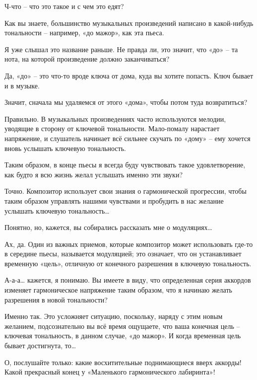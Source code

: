 \documentclass[../main.tex]{subfiles}
\begin{document}
\begin{Dialogue}
\begin{sublevel}
\begin{sublevel}
\begin{sublevel}
 Ч-что \--- что это такое и с чем это едят?

 Как вы знаете, большинство музыкальных произведений написано в какой-нибудь тональности \--- например, «до мажор», как эта пьеса.

 Я уже слышал это название раньше. Не правда ли, это значит, что «до» \--- та нота, на которой произведение должно заканчиваться?

 Да, «до» \--- это что-то вроде ключа от дома, куда вы хотите попасть. Ключ бывает и в музыке.

 Значит, сначала мы удаляемся от этого «дома», чтобы потом туда возвратиться?

 Правильно. В музыкальных произведениях часто используются мелодии, уводящие в сторону от ключевой тональности. Мало-помалу нарастает напряжение, и слушатель начинает всё сильнее скучать по «дому» \--- ему хочется вновь услышать ключевую тональность.

 Таким образом, в конце пьесы я всегда буду чувствовать такое удовлетворение, как будто я всю жизнь желал услышать именно эти звуки?

 Точно. Композитор использует свои знания о гармонической прогрессии, чтобы таким образом управлять нашими чувствами и пробудить в нас желание услышать ключевую тональность\ldots{}

 Понятно, но, кажется, вы собирались рассказать мне о модуляциях\ldots{}

 Ах, да. Один из важных приемов, которые композитор может использовать где-то в середине пьесы, называется модуляцией; это означает, что он устанавливает временную «цель», отличную от конечного разрешения в ключевую тональность.

 А-а-а\ldots{} кажется, я понимаю. Вы имеете в виду, что определенная серия аккордов изменяет гармоническое напряжение таким образом, что я начинаю желать разрешения в новой тональности?

 Именно так. Это усложняет ситуацию, поскольку, наряду с этим новым желанием, подсознательно вы всё время ощущаете, что ваша конечная цель \--- ключевая тональность, в данном случае, «до мажор». И когда временная цель бывает достигнута, то\ldots{}

 О, послушайте только: какие восхитительные поднимающиеся вверх аккорды! Какой прекрасный конец у «Маленького гармонического лабиринта»!


\end{sublevel}
\end{sublevel}
\end{sublevel}
\end{Dialogue}
\end{document}
